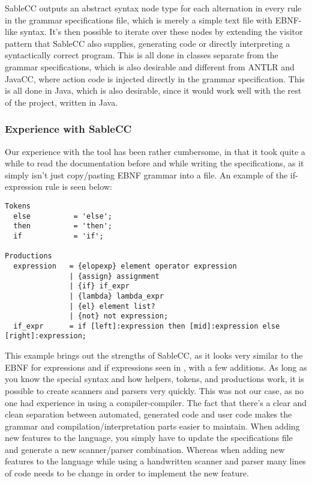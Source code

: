 SableCC outputs an abstract syntax node type for each alternation
in every rule in the grammar specifications file, which is merely a
simple text file with EBNF-like syntax. It's then possible to iterate
over these nodes by extending the visitor pattern that SableCC also
supplies, generating code or directly interpreting a syntactically
correct program. This is all done in classes separate from the grammar
specifications, which is also desirable and different from ANTLR
and JavaCC, where action code is injected directly in the grammar
specification. This is all done in Java, which is also desirable, since
it would work well with the rest of the project, written in Java.

\subsubsection{Experience with SableCC}
Our experience with the tool has been rather cumbersome, in that it took
quite a while to read the documentation before and while writing the
specifications, as it simply isn't just copy/pasting EBNF grammar
into a file. An example of the if-expression rule is seen below:

\begin{lstlisting}[caption={Part of the grammar specifications file of SableCC, with focus on if expressions.}]
Tokens
  else          = 'else';
  then          = 'then';
  if            = 'if';

Productions
  expression   = {elopexp} element operator expression
               | {assign} assignment
               | {if} if_expr
               | {lambda} lambda_expr
               | {el} element list?
               | {not} not expression;
  if_expr      = if [left]:expression then [mid]:expression else [right]:expression;
\end{lstlisting}

This example brings out the strengths of SableCC, as it looks very
similar to the EBNF for expressions and if expressions seen in
, with a few additions. As long as you know
the special syntax and how helpers, tokens, and productions work, it
is possible to create scanners and parsers very quickly. This was not
our case, as no one had experience in using a compiler-compiler. 
The fact that there's a clear and clean separation between automated, generated code
and user code makes the grammar and compilation/interpretation parts
easier to maintain. When adding new features to the language, you simply
have to update the specifications file and generate a new scanner/parser
combination. Whereas when adding new features to the language
while using a handwritten scanner and parser many lines of code needs
to be change in order to implement the new feature.

